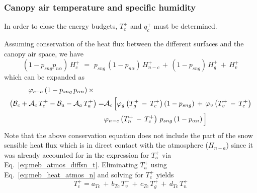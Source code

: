 {%
\subsubsection{Canopy air temperature and specific humidity}
\label{sec:meb_get_qc_and_tc}

In order to close the energy budgets, $T_c^+$ and $q_c^+$ 
must be determined. 

Assuming conservation of the heat flux between the different
surfaces and the canopy air space, 
we have
%
\begin{equation}
\label{eq:meb_sens_ca}
\left(1-p_{sng}p_{n\alpha}\right)\,H_{c}^+
\,\, = \,\, 
p_{sng}\,\left(1-p_{n\alpha}\right) \, 
H_{n-c}^+ \,+\, \left(1-p_{sng}\right)\,H_{g}^+\,+\, H_{v}^+ 
\end{equation}
%
which can be expanded as
%
\begin{equation}
\label{eq:meb_heat_conserv_x_n_s}
\begin{split}
\varphi_{c-a} \left(1-p_{sng}\,p_{\alpha n} \right) \times
\hskip.2in &
\\
\left( {\mathcal B}_{c} + {\mathcal A}_{c}\,T_c^+ - 
{\mathcal B}_{a} - {\mathcal A}_{a}\,T_{a}^+ 
\right) = &  {\mathcal A}_{c}\,\Big\lbrack
\varphi_{g} \left( T_g^+ \,-\,T_c^+ \right) \left(1-p_{sng}\right) \,+\, 
\varphi_{v} \left( T_v^+ \,-\,T_c^+ \right) 
\\
& \varphi_{n-c} \left( T_n^+ \,-\,T_c^+ \right) \,p_{sng}\left(1-p_{\alpha n}\right)
\Big\rbrack
%
\end{split}
\end{equation}
%
Note that the above conservation equation does not include the part of
the snow sensible heat flux which is in direct contact with the
atmosphere ($H_{n-a}$)
since it was already accounted for in the expression for $T_a^+$ via Eq.~\ref{eq:meb_atmos_diffsn_t}.
Eliminating $T_{a}^+$ using Eq.~\ref{eq:meb_heat_atmos_n} and solving 
for $T_c^+$ yields
%
\begin{equation}
\label{eq:meb_canopy_air_t_update}
T_c^+ = a_{Tc} \,+\, b_{Tc}\,T_v^+ \,+\, c_{Tc}\,T_g^+ \,+\, d_{Tc}\,T_n^+

\end{equation}}
